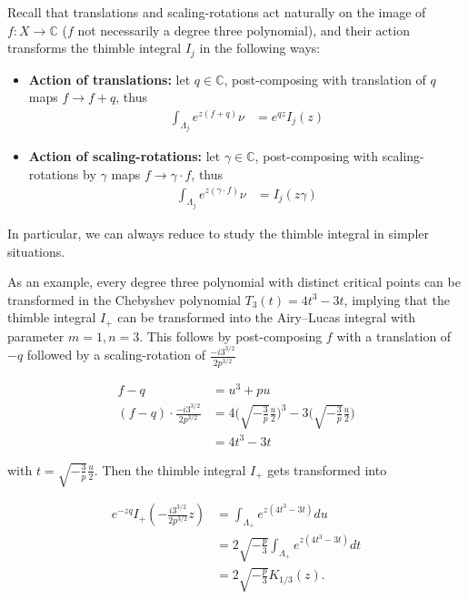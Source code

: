 \documentclass{article}
\theoremstyle{definition}
\newcommand{\C}{\mathbb{C}}
\begin{document}
Recall that translations and scaling-rotations act naturally on the image of $f\colon X\to \C$ ($f$ not necessarily a degree three polynomial), and their action transforms the thimble integral $I_j$ in the following ways:

\begin{itemize}
    \item \textbf{Action of translations:} let $q\in\C$, post-composing with translation of $q$ maps $f\to f+q$, thus 
    \begin{align*}
        \int_{\Lambda_j}e^{z (f+q)} \nu &= e^{qz} I_j(z)
    \end{align*}
    \item  \textbf{Action of scaling-rotations:} let $\gamma\in\C$, post-composing with scaling-rotations by $\gamma$ maps $f\to \gamma\cdot f$, thus 
    \begin{align*}
        \int_{\Lambda_j}e^{z (\gamma\cdot f)} \nu &= I_j(z \gamma)
    \end{align*}
\end{itemize}

In particular, we can always reduce to study the thimble integral in simpler situations. 

As an example, every degree three polynomial with distinct critical points can be transformed in the Chebyshev polynomial $T_3(t)=4 t^3-3t$, implying that the thimble integral $I_+$ can be transformed into the Airy--Lucas integral with parameter $m=1, n=3$. This follows by post-composing $f$ with a translation of $-q$ followed by a scaling-rotation of $\frac{ -i 3^{3/2}}{2 p^{3/2}}$

\begin{align*}
    f-q &= u^3 + pu \\
    (f-q) \cdot \frac{ -i 3^{3/2}}{2 p^{3/2}} &= 4 \Big(\sqrt{-\tfrac{3}{p}} \tfrac{u}{2} \Big)^{3} - 3\Big(\sqrt{-\tfrac{3}{p}} \tfrac{u}{2} \Big) \\
    &= 4 t^3- 3t 
\end{align*}

with $t= \sqrt{-\frac{3}{p}} \frac{u}{2}$. Then the thimble integral $I_+$ gets transformed into 

\begin{align*}
    e^{-zq} I_+\left(-\tfrac{i 3^{3/2}}{2 p^{3/2}} z\right)&= \int_{\Lambda_+} e^{z (4t^3-3t)} du\\
    &= 2\sqrt{-\tfrac{p}{3}} \int_{\Lambda_+} e^{z (4t^3-3t)} dt \\
    &= 2\sqrt{-\tfrac{p}{3}} K_{1/3}(z). 
\end{align*}
\end{document}
